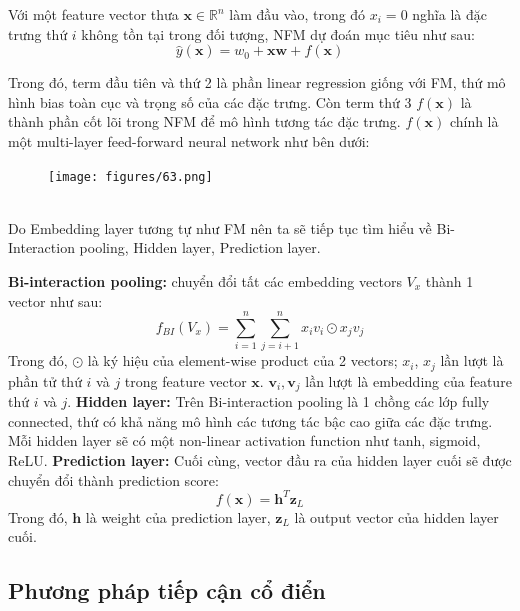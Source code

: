 \indent Với một feature vector thưa $\mathbf{x} \in \mathbb{R}^{n}$ làm đầu vào, trong đó $x_i = 0$ nghĩa là đặc trưng thứ $i$ không tồn tại trong đối tượng,
NFM dự đoán mục tiêu như sau:
$$ \hat{y}(\mathbf{x}) = w_0 + \mathbf{xw} + f(\mathbf{x})$$

Trong đó, term đầu tiên và thứ 2 là phần linear regression giống với FM,
thứ mô hình bias toàn cục và trọng số của các đặc trưng. Còn term thứ 3 $f(\mathbf{x})$ là thành phần cốt lõi trong NFM
để mô hình tương tác đặc trưng. $f(\mathbf{x})$ chính là một multi-layer feed-forward neural network như bên dưới:
\begin{figure}[h]
    \centering
    \texttt{[image: figures/63.png]}
\end{figure}\\
Do Embedding layer tương tự như FM nên ta sẽ tiếp tục tìm hiểu về Bi-Interaction pooling, Hidden layer, Prediction layer.

\textbf{Bi-interaction pooling:} chuyển đổi tất các embedding vectors $V_x$ thành 1 vector như sau:
$$ f_{BI}(V_x) = \sum_{i=1}^{n} \sum_{j=i+1}^{n} x_i v_i \odot x_j v_j $$
Trong đó, $\odot$ là ký hiệu của element-wise product của 2 vectors; $x_i$, $x_j$ lần lượt
là phần tử thứ $i$ và $j$ trong feature vector $\mathbf{x}$. $\mathbf{v}_i, \mathbf{v}_j$ lần lượt là embedding của feature thứ $i$ và $j$.
\textbf{Hidden layer:} Trên Bi-interaction pooling là 1 chồng các lớp fully connected, thứ có khả năng mô hình các tương tác bậc cao giữa các đặc trưng.
Mỗi hidden layer sẽ có một non-linear activation function như tanh, sigmoid, ReLU.
\textbf{Prediction layer:} Cuối cùng, vector đầu ra của hidden layer cuối sẽ được chuyển đổi thành prediction score:
$$f(\mathbf{x}) = \mathbf{h}^T \mathbf{z}_L$$
Trong đó, $\mathbf{h}$ là weight của prediction layer, $\mathbf{z}_L$ là output vector của hidden layer cuối.

\subsection{Phương pháp tiếp cận cổ điển}
